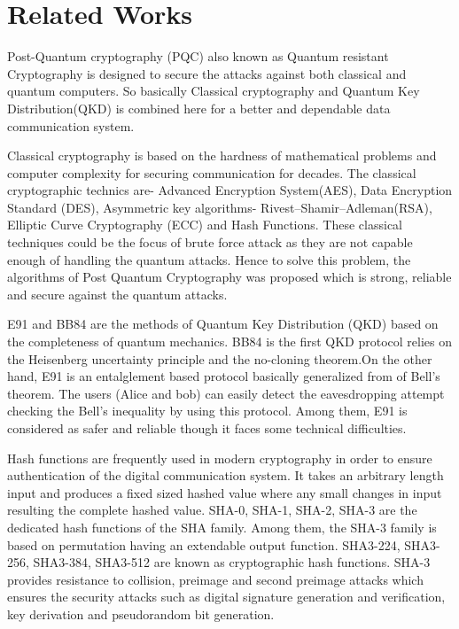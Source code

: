 \documentclass{article}
\begin{document}
\section{Related Works}
\label{sec:relatedWorks}
Post-Quantum cryptography (PQC) also known as Quantum resistant Cryptography is designed to secure the attacks against both classical and quantum computers. So basically Classical cryptography and Quantum Key Distribution(QKD) is combined here for a better and dependable data communication system.

Classical cryptography is based on the hardness of mathematical problems and computer complexity for securing communication for decades. The classical cryptographic technics are- Advanced Encryption System(AES), Data Encryption Standard (DES), Asymmetric key algorithms- Rivest–Shamir–Adleman(RSA), Elliptic Curve Cryptography (ECC) and Hash Functions. These classical techniques could be the focus of brute force attack as they are not capable enough of handling the quantum attacks. Hence to solve this problem, the algorithms of Post Quantum Cryptography was proposed which is strong, reliable and secure against the quantum attacks.\cite{sharma2023post}

E91 and BB84 are the methods of Quantum Key Distribution (QKD) based on the completeness of quantum mechanics. BB84 is the first QKD protocol relies on the Heisenberg uncertainty principle and the no-cloning theorem.On the other hand,  E91 is an entalglement based protocol basically generalized from of Bell’s theorem. The users (Alice and bob) can easily detect the eavesdropping attempt checking the Bell’s inequality by using this protocol. \cite{ekert1991quantum} Among them, E91 is considered as safer and reliable though it faces some technical difficulties.\cite{alvarez2016comparison}

Hash functions are frequently used in modern cryptography in order to ensure authentication of the digital communication system. It takes an arbitrary length input and produces a fixed sized hashed value where any small changes in input resulting the complete hashed value. SHA-0, SHA-1, SHA-2, SHA-3 are the dedicated hash functions of the SHA family.\cite{madhuravani2013cryptographic} Among them, the SHA-3 family is based on permutation having an extendable output function. SHA3-224, SHA3-256, SHA3-384, SHA3-512 are known as cryptographic hash functions. SHA-3 provides resistance to collision, preimage and second preimage attacks which ensures the security attacks such as digital signature generation and verification, key derivation and pseudorandom bit generation. \cite{dworkin2015sha}
\end{document}
